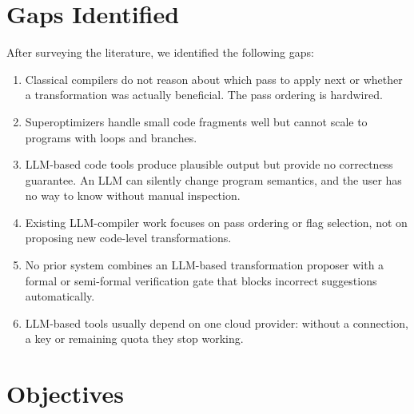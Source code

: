 \documentclass[12pt,a4paper]{report}
\begin{document}
\section{Gaps Identified}

After surveying the literature, we identified the following gaps:
\begin{enumerate}[leftmargin=2cm]
  \item Classical compilers do not reason about which pass to apply next or whether a transformation was actually beneficial. The pass ordering is hardwired.
  \item Superoptimizers handle small code fragments well but cannot scale to programs with loops and branches.
  \item LLM-based code tools produce plausible output but provide no correctness guarantee. An LLM can silently change program semantics, and the user has no way to know without manual inspection.
  \item Existing LLM-compiler work focuses on pass ordering or flag selection, not on proposing new code-level transformations.
  \item No prior system combines an LLM-based transformation proposer with a formal or semi-formal verification gate that blocks incorrect suggestions automatically.
  \item LLM-based tools usually depend on one cloud provider: without a connection, a key or remaining quota they stop working.
\end{enumerate}

\section{Objectives}
\end{document}

